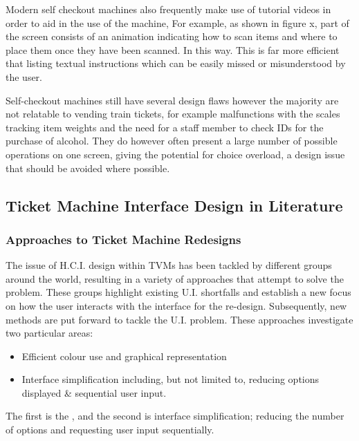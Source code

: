 Modern self checkout machines also frequently make use of tutorial videos in order to aid in the use of the machine, For example, as shown in figure x, part of the screen consists of an animation indicating how to scan items and where to place them once they have been scanned. In this way. This is far more efficient that listing textual instructions which can be easily missed or misunderstood by the user. 

Self-checkout machines still have several design flaws however the majority are not relatable to vending train tickets, for example malfunctions with the scales tracking item weights and the need for a staff member to check IDs for the purchase of alcohol. They do however often present a large number of possible operations on one screen, giving the potential for choice overload, a design issue that should be avoided where possible.

\subsection{Ticket Machine Interface Design in Literature}

\subsubsection{Approaches to Ticket Machine Redesigns}
The issue of H.C.I. design within TVMs has been tackled by different groups around the world, resulting in a variety of approaches that attempt to solve the problem. These groups highlight existing U.I. shortfalls and establish a new focus on how the user interacts with the interface for the re-design. Subsequently, new methods are put forward to tackle the U.I. problem. These approaches investigate two particular areas:

\begin{itemize}
	\item Efficient colour use and graphical representation
	\item Interface simplification including, but not limited to, reducing options displayed \& sequential user input.
\end{itemize}
 The first is the , and the second is interface simplification; reducing the number of options and requesting user input sequentially.


